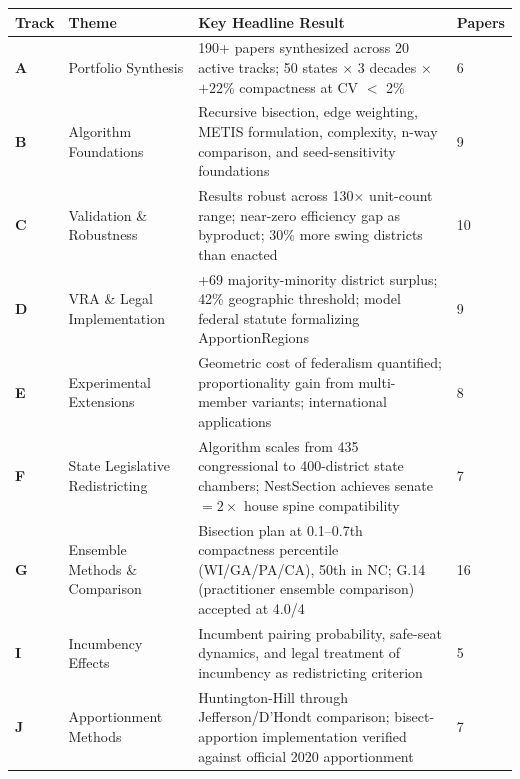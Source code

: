 \documentclass[12pt]{article}
\begin{document}
\begin{longtable}{@{}llp{5.2cm}l@{}}
\toprule
\textbf{Track} & \textbf{Theme} & \textbf{Key Headline Result} &
    \textbf{Papers} \\
\midrule
\endhead

\textbf{A} & Portfolio Synthesis &
    190+ papers synthesized across 20 active tracks; 50 states $\times$ 3 decades
    $\times$ $+22\%$ compactness at CV $<$ 2\% &
    6 \\[4pt]

\textbf{B} & Algorithm Foundations &
    Recursive bisection, edge weighting, METIS formulation, complexity,
    n-way comparison, and seed-sensitivity foundations &
    9 \\[4pt]

\textbf{C} & Validation \& Robustness &
    Results robust across 130$\times$ unit-count range; near-zero efficiency
    gap as byproduct; 30\% more swing districts than enacted &
    10 \\[4pt]

\textbf{D} & VRA \& Legal Implementation &
    +69 majority-minority district surplus; 42\% geographic threshold;
    model federal statute formalizing ApportionRegions &
    9 \\[4pt]

\textbf{E} & Experimental Extensions &
    Geometric cost of federalism quantified; proportionality gain from
    multi-member variants; international applications &
    8 \\[4pt]

\textbf{F} & State Legislative Redistricting &
    Algorithm scales from 435 congressional to 400-district state chambers;
    NestSection achieves senate $= 2{\times}$ house spine compatibility &
    7 \\[4pt]

\textbf{G} & Ensemble Methods \& Comparison &
    Bisection plan at 0.1--0.7th compactness percentile (WI/GA/PA/CA),
    50th in NC; G.14 (practitioner ensemble comparison) accepted at 4.0/4 &
    16 \\[4pt]

\textbf{I} & Incumbency Effects &
    Incumbent pairing probability, safe-seat dynamics, and legal treatment
    of incumbency as redistricting criterion &
    5 \\[4pt]

\textbf{J} & Apportionment Methods &
    Huntington-Hill through Jefferson/D'Hondt comparison; bisect-apportion
    implementation verified against official 2020 apportionment &
    7 \\[4pt]


\end{longtable}
\end{document}

